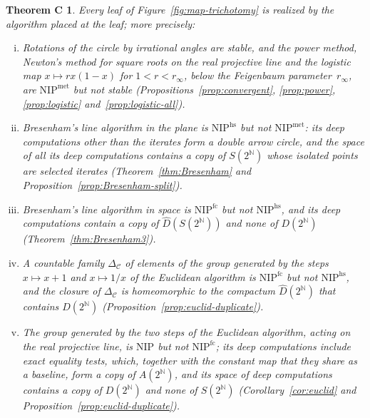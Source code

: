 \documentclass[psamsfonts]{amsart}
\newtheorem*{thmC}{Theorem C}
\theoremstyle{definition}
\theoremstyle{remark}
\newcommand{\NIP}{\text{NIP}}
\numberwithin{equation}{section}
\begin{document}
\begin{thmC}
  Every leaf of Figure~\ref{fig:map-trichotomy} is realized by the algorithm placed at the leaf; more precisely:
  \begin{enumerate}[(i)]
  \item Rotations of the circle by irrational angles are stable, and the power method, Newton's method for square roots on the real projective line and the logistic map $x\mapsto rx(1-x)$ for $1<r<r_\infty$, below the Feigenbaum parameter~$r_\infty$, are $\NIP^{\mathrm{met}}$ but not stable (Propositions~\ref{prop:convergent}, \ref{prop:power}, \ref{prop:logistic} and~\ref{prop:logistic-all}).
  \item Bresenham's line algorithm in the plane is $\NIP^{\mathrm{hs}}$ but not $\NIP^{\mathrm{met}}$: its deep computations other than the iterates form a double arrow circle, and the space of all its deep computations contains a copy of $S(2^{\mathbb{N}})$ whose isolated points are selected iterates (Theorem~\ref{thm:Bresenham} and Proposition~\ref{prop:Bresenham-split}).
  \item Bresenham's line algorithm in space is $\NIP^{\mathrm{fc}}$ but not $\NIP^{\mathrm{hs}}$, and its deep computations contain a copy of $\hat D(S(2^{\mathbb{N}}))$ and none of $D(2^{\mathbb{N}})$ (Theorem~\ref{thm:Bresenham3}).
  \item A countable family $\Delta_{\mathcal{C}}$ of elements of the group generated by the steps $x\mapsto x+1$ and $x\mapsto1/x$ of the Euclidean algorithm is $\NIP^{\mathrm{fc}}$ but not $\NIP^{\mathrm{hs}}$, and the closure of $\Delta_{\mathcal{C}}$ is homeomorphic to the compactum $\hat D(2^{\mathbb{N}})$ that contains $D(2^{\mathbb{N}})$ (Proposition~\ref{prop:euclid-duplicate}).
  \item The group generated by the two steps of the Euclidean algorithm, acting on the real projective line, is $\NIP$ but not $\NIP^{\mathrm{fc}}$; its deep computations include exact equality tests, which, together with the constant map that they share as a baseline, form a copy of $A(2^{\mathbb{N}})$, and its space of deep computations contains a copy of $D(2^{\mathbb{N}})$ and none of $S(2^{\mathbb{N}})$ (Corollary~\ref{cor:euclid} and Proposition~\ref{prop:euclid-duplicate}).
  \end{enumerate}
\end{thmC}
\end{document}
